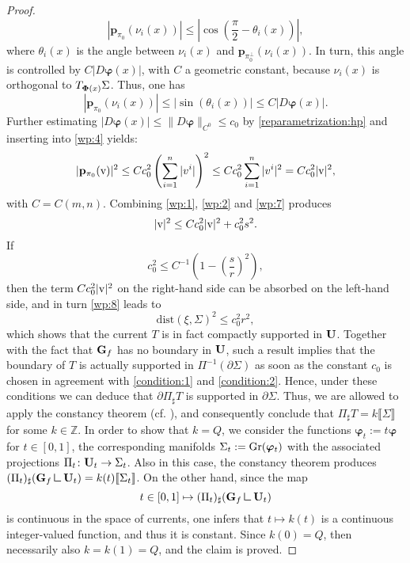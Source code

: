 \documentclass[a4paper,11pt,reqno]{amsart}
\theoremstyle{definition}
\numberwithin{equation}{section}
\numberwithin{subsection}{section}
\newcommand{\mres}{\mathbin{\vrule height 1.6ex depth 0pt width
0.13ex\vrule height 0.13ex depth 0pt width 1.3ex}}
\newcommand{\dist}{\mathrm{dist}}
\newcommand{\bphi}{\boldsymbol{\varphi}}
\newcommand{\p}{\mathbf{p}}
\begin{document}
\begin{proof}
\begin{equation} \label{wp:5}
|\p_{\pi_{0}}(\nu_{i}(x))| \leq \left| \cos\left( \frac{\pi}{2} - \theta_{i}(x) \right) \right|,
\end{equation}
where $\theta_{i}(x)$ is the angle between $\nu_{i}(x)$ and $\p_{\pi_{0}^{\perp}}(\nu_{i}(x))$. In turn, this angle is controlled by $C |D\bphi(x)|$, with $C$ a geometric constant, because $\nu_{i}(x)$ is orthogonal to $T_{{\bf \Phi}(x)}\Sigma$. Thus, one has
\begin{equation} \label{wp:6}
|\p_{\pi_{0}}(\nu_{i}(x))| \leq \left| \sin(\theta_{i}(x)) \right| \leq C |D\bphi(x)|.
\end{equation}
Further estimating $|D\bphi(x)| \leq \|D\bphi\|_{C^0} \leq c_{0}$ by \eqref{reparametrization:hp} and inserting into \eqref{wp:4} yields:
\begin{equation} \label{wp:7}
|\p_{\pi_{0}}({\rm v})|^{2} \leq C c_{0}^{2} \left( \sum_{i=1}^{n} |v^{i}| \right)^{2} \leq C c_{0}^{2} \sum_{i=1}^{n} |v^{i}|^{2} = C c_{0}^{2} |{\rm v}|^{2},
\end{equation}
with $C = C(m,n)$. Combining \eqref{wp:1}, \eqref{wp:2} and \eqref{wp:7} produces 
\begin{equation} \label{wp:8}
|{\rm v}|^{2} \leq C c_{0}^{2} |{\rm v}|^{2} + c_{0}^{2} s^{2}.
\end{equation}
If
\begin{equation} \label{condition:2}
c_{0}^{2} \leq C^{-1} \left( 1 - \left( \frac{s}{r} \right)^{2} \right),
\end{equation}
then the term $C c_{0}^{2} |{\rm v}|^{2}$ on the right-hand side can be absorbed on the left-hand side, and in turn \eqref{wp:8} leads to
\begin{equation} \label{wp:9}
\dist(\xi, \Sigma)^{2} \leq c_{0}^{2} r^{2},
\end{equation}
which shows that the current $T$ is in fact compactly supported in ${\bf U}$. Together with the fact that ${\bf G}_{f}$ has no boundary in ${\bf U}$, such a result implies that the boundary of $T$ is actually supported in $\Pi^{-1}(\partial\Sigma)$ as soon as the constant $c_{0}$ is chosen in agreement with \eqref{condition:1} and \eqref{condition:2}. Hence, under these conditions we can deduce that $\partial \Pi_{\sharp} T$ is supported in $\partial \Sigma$. Thus, we are allowed to apply the constancy theorem (cf. \cite[Theorem 26.27]{Sim83}), and consequently conclude that $\Pi_{\sharp}T = k \llbracket \Sigma \rrbracket$ for some $k \in \mathbb{Z}$. In order to show that $k = Q$, we consider the functions $\bphi_{t} := t \bphi$ for $t \in \left[ 0, 1 \right]$, the corresponding manifolds $\Sigma_{t} := {\rm Gr}(\bphi_{t})$ with the associated projections $\Pi_{t} \colon {\bf U}_{t} \to \Sigma_{t}$. Also in this case, the constancy theorem produces $(\Pi_{t})_{\sharp}({\bf G}_{f} \mres {\bf U}_t ) = k(t) \llbracket \Sigma_{t} \rrbracket$. On the other hand, since the map
\[
t \in \left[ 0, 1 \right] \mapsto (\Pi_{t})_{\sharp}({\bf G}_{f} \mres {\bf U}_t)
\]
is continuous in the space of currents, one infers that $t \mapsto k(t)$ is a continuous integer-valued function, and thus it is constant. Since $k(0) = Q$, then necessarily also $k = k(1) = Q$, and the claim is proved.


\end{proof}
\end{document}
